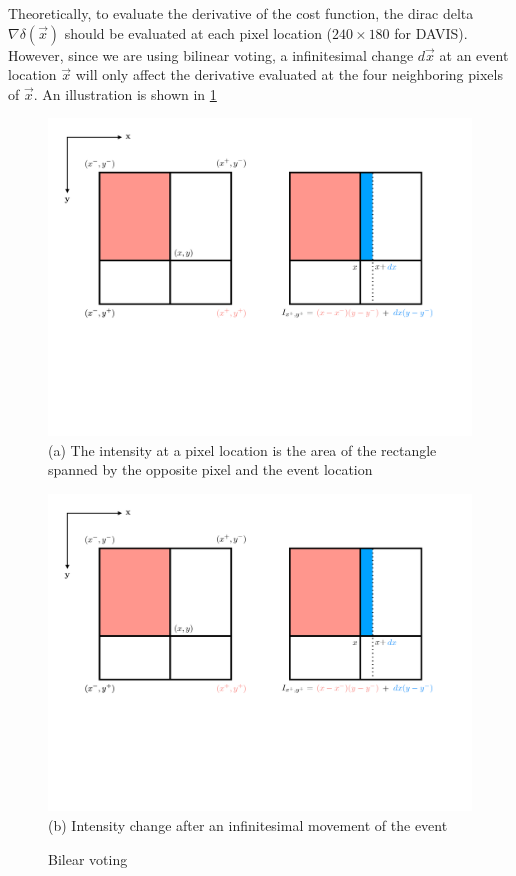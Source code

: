 Theoretically, to evaluate the derivative of the cost function, the
dirac delta $\nabla\delta(\vec{x})$ should be evaluated at each pixel
location ($240\times180$ for DAVIS). However, since we are using
bilinear voting, a infinitesimal change $d\vec{x}$ at an event
location $\vec{x}$ will only affect the derivative evaluated at the
four neighboring pixels of $\vec{x}$. An illustration is shown in
\cref{fig:bi_voting}

\begin{figure}
  \begin{minipage}[t]{0.48\textwidth}
    \centering \includegraphics[trim={1cm 7cm 18cm 1cm},clip,width =
    \textwidth]{images/bi_voting.pdf} (a) The intensity at a pixel
    location is the area of the rectangle spanned by the opposite
    pixel and the event location
  \end{minipage}
  \hfill
  \begin{minipage}[t]{0.48\textwidth}
    \centering \includegraphics[trim={18cm 7cm 1cm 1cm},clip,width =
    \textwidth]{images/bi_voting.pdf} (b) Intensity change after an
    infinitesimal movement of the event
  \end{minipage}
  \caption{Bilear voting}
  \label{fig:bi_voting}
\end{figure}
